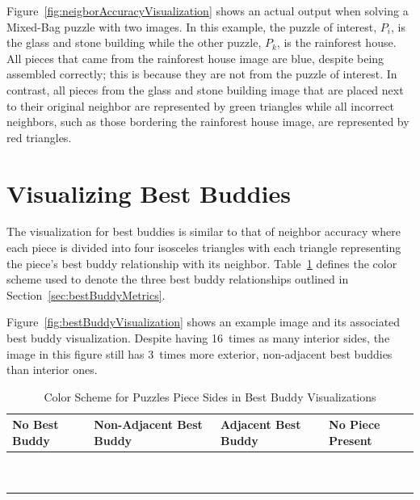 Figure~\ref{fig:neigborAccuracyVisualization} shows an actual output when solving a Mixed-Bag puzzle with two images.  In this example, the puzzle of interest, $P_i$, is the glass and stone building while the other puzzle, $P_k$, is the rainforest house.  All pieces that came from the rainforest house image are blue, despite being assembled correctly; this is because they are not from the puzzle of interest.  In contrast, all pieces from the glass and stone building image that are placed next to their original neighbor are represented by green triangles while all incorrect neighbors, such as those bordering the rainforest house image, are represented by red triangles.

\section{Visualizing Best Buddies}\label{sec:visualizingBestBuddies}

The visualization for best buddies is similar to that of neighbor accuracy where each piece is divided into four isosceles triangles with each triangle representing the piece's best buddy relationship with its neighbor.  Table~\ref{tab:bestBuddyColors} defines the color scheme used to denote the three best buddy relationships outlined in Section~\ref{sec:bestBuddyMetrics}.  

Figure~\ref{fig:bestBuddyVisualization} shows an example image and its associated best buddy visualization.  Despite having 16~times as many interior sides, the image in this figure still has 3~times more exterior, non-adjacent best buddies than interior ones.

\begin{table}[tb]
\begin{center}
  \begin{tabular}{ | >{\centering\arraybackslash}m{1.0in} | >{\centering\arraybackslash}m{1.0in} | >{\centering\arraybackslash}m{1.0in} | >{\centering\arraybackslash}m{1.0in} | }
  
   \hline
    No Best Buddy & Non-Adjacent Best Buddy & Adjacent Best Buddy & No Piece Present  \\ \hline
	{\cellcolor{white}~} & {\cellcolor{red}~} & {\cellcolor{green}~} & {\cellcolor{black}~}  \\
	{\cellcolor{white}~} & {\cellcolor{red}~} & {\cellcolor{green}~} & {\cellcolor{black}~}  \\
 \hline

  \end{tabular}
\end{center}
\caption{Color Scheme for Puzzles Piece Sides in Best Buddy Visualizations}\label{tab:bestBuddyColors}
\end{table}


